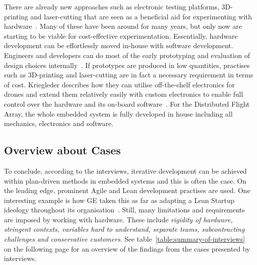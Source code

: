 \documentclass[english]{tktltiki2}
\begin{document}
There are already new approaches such as electronic testing platforms, 3D-printing and laser-cutting that are seen as a beneficial aid for experimenting with hardware~\cite{Kri15}. Many of these have been around for many years, but only now are starting to be viable for cost-effective experimentation. Essentially, hardware development can be effortlessly moved in-house with software development. Engineers and developers can do most of the early prototyping and evaluation of design choices internally~\cite{Kri15}. If prototypes are produced in low quantities, practises such as 3D-printing and laser-cutting are in fact a necessary requirement in terms of cost. Kriegleder describes how they can utilise off-the-shelf electronics for drones and extend them relatively easily with custom electronics to enable full control over the hardware and its on-board software~\cite{Kri15}. For the Distributed Flight Array, the whole embedded system is fully developed in house including all mechanics, electronics and software.

\subsection{Overview about Cases}

To conclude, according to the interviews, iterative development can be achieved within plan-driven methods in embedded systems and this is often the case. On the leading edge, prominent Agile and Lean development practises are used. One interesting example is how GE taken this as far as adapting a Lean Startup ideology throughout its organisation~\cite{BT15}. Still, many limitations and requirements are imposed by working with hardware. These include \emph{rigidity of hardware, stringent contexts, variables hard to understand, separate teams, subcontracting challenges and conservative customers}. See table~\ref{table:summary-of-interviews} on the following page for an overview of the findings from the cases presented by interviews.

\end{document}
